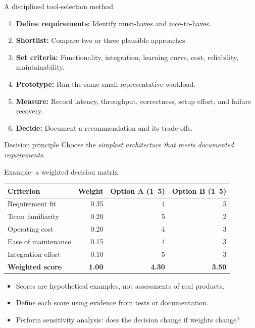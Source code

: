 \documentclass[aspectratio=43,10pt]{beamer}
\begin{document}
\begin{frame}{A disciplined tool-selection method}
\begin{enumerate}
  \item \textbf{Define requirements:} Identify must-haves and nice-to-haves.
  \item \textbf{Shortlist:} Compare two or three plausible approaches.
  \item \textbf{Set criteria:} Functionality, integration, learning curve, cost, reliability, maintainability.
  \item \textbf{Prototype:} Run the same small representative workload.
  \item \textbf{Measure:} Record latency, throughput, correctness, setup effort, and failure recovery.
  \item \textbf{Decide:} Document a recommendation and its trade-offs.
\end{enumerate}
\begin{block}{Decision principle}
Choose the \emph{simplest architecture that meets documented requirements}.
\end{block}
\end{frame}

\begin{frame}{Example: a weighted decision matrix}
\small
\begin{tabular}{@{}lrrr@{}}
\toprule
\textbf{Criterion} & \textbf{Weight} & \textbf{Option A (1--5)} & \textbf{Option B (1--5)} \\
\midrule
Requirement fit & 0.35 & 4 & 5 \\
Team familiarity & 0.20 & 5 & 2 \\
Operating cost & 0.20 & 4 & 3 \\
Ease of maintenance & 0.15 & 4 & 3 \\
Integration effort & 0.10 & 5 & 3 \\
\midrule
\textbf{Weighted score} & \textbf{1.00} & \textbf{4.30} & \textbf{3.50} \\
\bottomrule
\end{tabular}
\vspace{0.8em}
\begin{itemize}
  \item Scores are hypothetical examples, not assessments of real products.
  \item Define each score using evidence from tests or documentation.
  \item Perform sensitivity analysis: does the decision change if weights change?
\end{itemize}
\end{frame}
\end{document}
